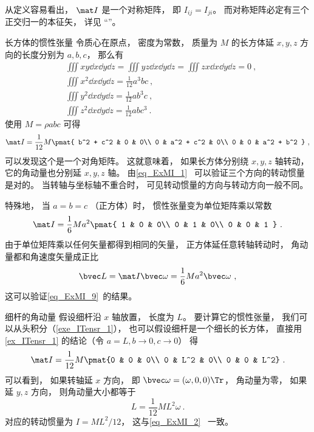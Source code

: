 从定义容易看出， $\mat I$ 是一个对称矩阵， 即 $I_{ij} = I_{ji}$。 而对称矩阵必定有三个正交归一的本征矢， 详见 “”。

\begin{example}{长方体的惯性张量}\label{ex_ITensr_1}
令质心在原点， 密度为常数， 质量为 $M$ 的长方体延 $x, y, z$ 方向的长度分别为 $a, b, c$， 那么有
\begin{equation}
\begin{aligned}
&\iiint xy \dd{x}\dd{y}\dd{z} = \iiint yz \dd{x}\dd{y}\dd{z} = \iiint zx \dd{x}\dd{y}\dd{z} = 0~,\\
&\iiint x^2 \dd{x}\dd{y}\dd{z} = \frac{1}{12} a^3 bc~,\\
&\iiint y^2 \dd{x}\dd{y}\dd{z} = \frac{1}{12} ab^3 c~,\\
&\iiint z^2 \dd{x}\dd{y}\dd{z} = \frac{1}{12} ab c^3~.
\end{aligned}
\end{equation}
使用 $M = \rho abc$ 可得
\begin{equation}\label{eq_ITensr_4}
\mat I = \frac{1}{12} M
\pmat{
   b^2 + c^2 & 0 & 0\\
   0 & a^2 + c^2 & 0\\
   0 & 0 & a^2 + b^2
}~,
\end{equation}
可以发现这个是一个对角矩阵。 这就意味着， 如果长方体分别绕 $x, y, z$ 轴转动， 它的角动量也分别延 $x, y, z$ 轴。 由\autoref{eq_ExMI_1}~ 可以验证三个方向的转动惯量是对的。 当转轴与坐标轴不重合时， 可见转动惯量的方向与转动方向一般不同。

特殊地， 当 $a = b = c$ （正方体）时， 惯性张量变为单位矩阵乘以常数
\begin{equation}
\mat I = \frac{1}{6} Ma^2
\pmat{
   1 & 0 & 0\\
   0 & 1 & 0\\
   0 & 0 & 1
}~.
\end{equation}
由于单位矩阵乘以任何矢量都得到相同的矢量， 正方体延任意转轴转动时， 角动量都和角速度矢量成正比
\begin{equation}
\bvec L = \mat I \bvec \omega = \frac{1}{6} Ma^2 \bvec \omega~,
\end{equation}
这可以验证\autoref{eq_ExMI_9}~的结果。
\end{example}

\begin{example}{细杆的角动量}
假设细杆沿 $x$ 轴放置， 长度为 $L$。 要计算它的惯性张量， 我们可以从头积分（\autoref{exe_ITensr_1}）， 也可以假设细杆是一个细长的长方体， 直接用\autoref{ex_ITensr_1} 的结论（令 $a = L, b \to 0, c \to 0$） 得
\begin{equation}\label{eq_ITensr_5}
\mat I = \frac{1}{12} M \pmat{0 & 0 & 0\\ 0 & L^2 & 0\\ 0 & 0 & L^2}~.
\end{equation}
可以看到， 如果转轴延 $x$ 方向， 即 $\bvec\omega = (\omega, 0, 0)\Tr$， 角动量为零， 如果延 $y, z$ 方向， 则角动量大小都等于
\begin{equation}
L = \frac{1}{12} M L^2 \omega~.
\end{equation}
对应的转动惯量为 $I = ML^2/12$， 这与\autoref{eq_ExMI_2}~ 一致。
\end{example}

